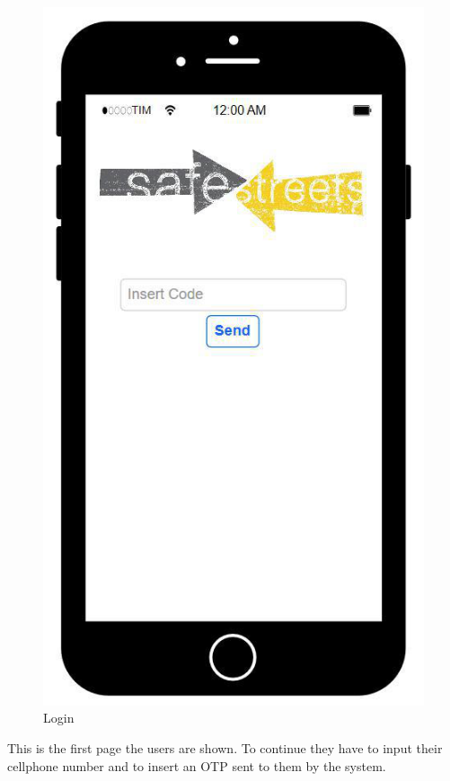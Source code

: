 \begin{figure}
\includegraphics[scale=0.5]{Images/Templates/User/us_2.png}
\caption{\label{fig:Mockup-1}Login}
\end{figure}

This is the first page the users are shown. To continue they have to input their cellphone number and to insert an OTP sent to them by the system.

